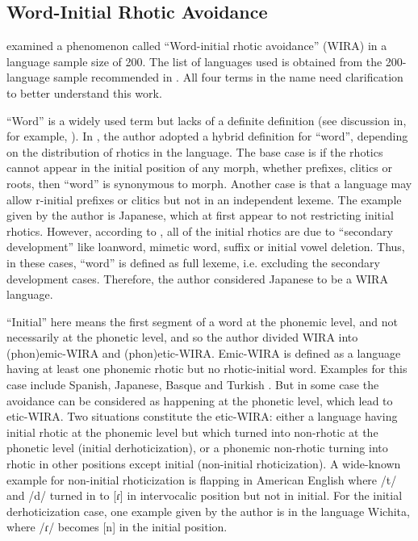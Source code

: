 \subsection{Word-Initial Rhotic Avoidance}

\citet{labrune2021word} examined a phenomenon called ``Word-initial rhotic avoidance'' (WIRA) in a language sample size of 200. 
The list of languages used is obtained from the 200-language sample recommended in \citet{wals}. 
All four terms in the name need clarification to better understand this work. 

\par
``Word'' is a widely used term but lacks of a definite definition (see discussion in, for example, \citet{martin2017indeterminacy}). 
In \citet{labrune2021word}, the author adopted a hybrid definition for ``word'', depending on the distribution of rhotics in the language.
The base case is if the rhotics cannot appear in the initial position of any morph, whether prefixes, clitics or roots, then ``word'' is synonymous to morph.
Another case is that a language may allow r-initial prefixes or clitics but not in an independent lexeme.
The example given by the author is Japanese, which at first appear to not restricting initial rhotics.
However, according to \citet{labrune2021word}, all of the initial rhotics are due to ``secondary development'' like loanword, mimetic word, suffix or initial vowel deletion.
Thus, in these cases, ``word'' is defined as full lexeme, i.e. excluding the secondary development cases.
Therefore, the author considered Japanese to be a WIRA language.

\par
``Initial'' here means the first segment of a word at the phonemic level, and not necessarily at the phonetic level, and so the author divided  WIRA into (phon)emic-WIRA and (phon)etic-WIRA. 
Emic-WIRA is defined as a language having at least one phonemic rhotic but no rhotic-initial word.
Examples for this case include Spanish, Japanese, Basque and Turkish \citep{labrune2021word}. 
But in some case the avoidance can be considered as happening at the phonetic level, which lead to etic-WIRA. 
Two situations constitute the etic-WIRA: either a language having initial rhotic at the phonemic level but which turned into non-rhotic at the phonetic level (initial derhoticization), or a phonemic non-rhotic turning into rhotic in other positions except initial (non-initial rhoticization).
A wide-known example for non-initial rhoticization is flapping in American English where /t/ and /d/ turned in to [ɾ] in intervocalic position but not in initial.
For the initial derhoticization case, one example given by the author is in the language Wichita, where /ɾ/ becomes [n] in the initial position. 


